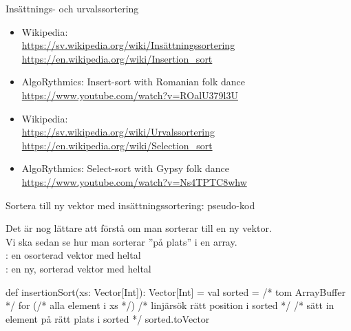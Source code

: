 \begin{Slide}{Insättnings- och urvalssortering}
\begin{itemize}
\item Wikipedia:\\
{\SlideFontSmall\url{https://sv.wikipedia.org/wiki/Insättningssortering}}
{\SlideFontSmall\url{https://en.wikipedia.org/wiki/Insertion_sort}}

\item AlgoRythmics: Insert-sort with Romanian folk dance\\
{\SlideFontSmall\url{https://www.youtube.com/watch?v=ROalU379l3U}}
\end{itemize}

\vspace{2em}

\begin{itemize}
\item Wikipedia:\\ 
{\SlideFontSmall\url{https://sv.wikipedia.org/wiki/Urvalssortering}}\\
{\SlideFontSmall\url{https://en.wikipedia.org/wiki/Selection_sort}}

\item AlgoRythmics: Select-sort with Gypsy folk dance \\ 
{\SlideFontSmall\url{https://www.youtube.com/watch?v=Ns4TPTC8whw}}
\end{itemize}
\end{Slide}




\begin{Slide}{Sortera till ny vektor med insättningssortering: pseudo-kod}

{\SlideFontSmall Det är nog lättare att förstå  om man sorterar till en ny vektor. \\ Vi ska sedan se hur man sorterar ''på plats''  i en  array.\\} \vspace{1em}
: en osorterad vektor med heltal \\
: en ny, sorterad vektor med heltal
\begin{Code}
def insertionSort(xs: Vector[Int]): Vector[Int] = {
  val sorted = /* tom ArrayBuffer */
  for (/* alla element i xs */) {
     /* linjärsök rätt position i sorted */
     /* sätt in element på rätt plats i sorted */
  }
  sorted.toVector
}
\end{Code}
\end{Slide}


